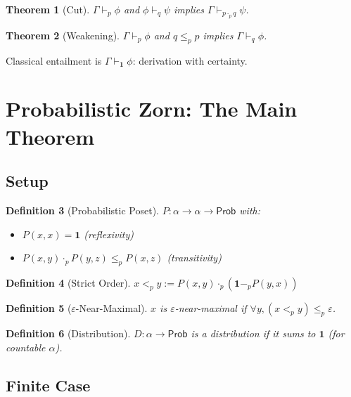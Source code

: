 \documentclass[11pt,a4paper]{article}
\newtheorem{theorem}{Theorem}[section]
\newtheorem{definition}[theorem]{Definition}
\newcommand{\Prob}{\mathsf{Prob}}
\newcommand{\pone}{\mathbf{1}}
\newcommand{\ple}{\leq_p}
\newcommand{\plt}{<_p}
\newcommand{\pmul}{\cdot_p}
\newcommand{\psub}{-_p}
\begin{document}
\begin{theorem}[Cut]
$\Gamma \vdash_p \phi$ and $\phi \vdash_q \psi$ implies $\Gamma \vdash_{p \pmul q} \psi$.
\end{theorem}

\begin{theorem}[Weakening]
$\Gamma \vdash_p \phi$ and $q \ple p$ implies $\Gamma \vdash_q \phi$.
\end{theorem}

Classical entailment is $\Gamma \vdash_{\pone} \phi$: derivation with certainty.

\section{Probabilistic Zorn: The Main Theorem}

\subsection{Setup}

\begin{definition}[Probabilistic Poset]
$P : \alpha \to \alpha \to \Prob$ with:
\begin{itemize}
    \item $P(x,x) = \pone$ (reflexivity)
    \item $P(x,y) \pmul P(y,z) \ple P(x,z)$ (transitivity)
\end{itemize}
\end{definition}

\begin{definition}[Strict Order]
$x \plt y := P(x,y) \pmul (\pone \psub P(y,x))$
\end{definition}

\begin{definition}[$\varepsilon$-Near-Maximal]
$x$ is $\varepsilon$-near-maximal if $\forall y, (x \plt y) \ple \varepsilon$.
\end{definition}

\begin{definition}[Distribution]
$D : \alpha \to \Prob$ is a distribution if it sums to $\pone$ (for countable $\alpha$).
\end{definition}

\subsection{Finite Case}
\end{document}
